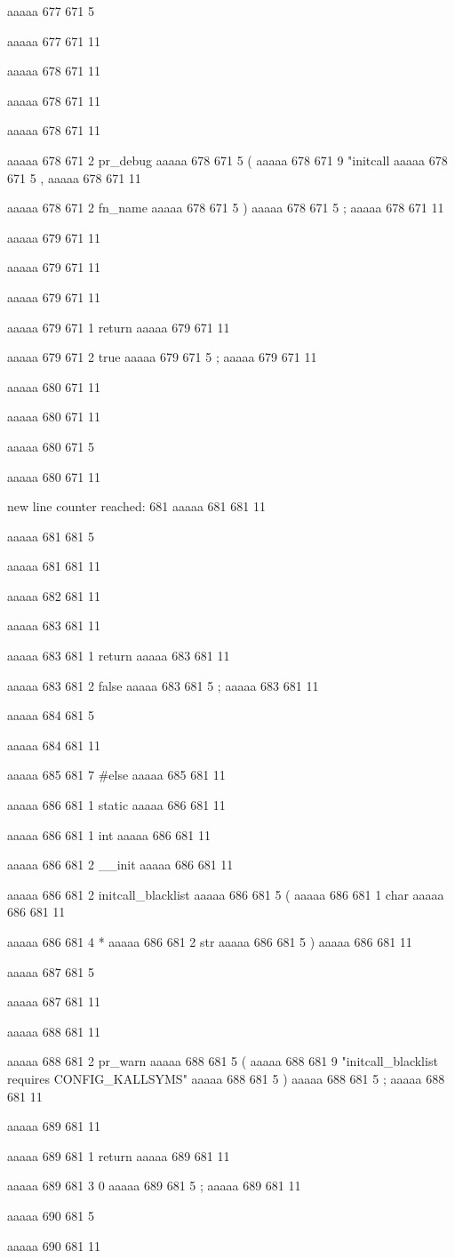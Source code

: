 {{aaaaa 677 671
5
{
aaaaa 677 671
11


aaaaa 678 671
11
	
aaaaa 678 671
11
	
aaaaa 678 671
11
	
aaaaa 678 671
2
pr_debug
aaaaa 678 671
5
(
aaaaa 678 671
9
"initcall %
aaaaa 678 671
5
,
aaaaa 678 671
11
 
aaaaa 678 671
2
fn_name
aaaaa 678 671
5
)
aaaaa 678 671
5
;
aaaaa 678 671
11


aaaaa 679 671
11
	
aaaaa 679 671
11
	
aaaaa 679 671
11
	
aaaaa 679 671
1
return
aaaaa 679 671
11
 
aaaaa 679 671
2
true
aaaaa 679 671
5
;
aaaaa 679 671
11


aaaaa 680 671
11
	
aaaaa 680 671
11
	
aaaaa 680 671
5
}
aaaaa 680 671
11


new line counter reached: 681
aaaaa 681 681
11
	
aaaaa 681 681
5
}
aaaaa 681 681
11


aaaaa 682 681
11


aaaaa 683 681
11
	
aaaaa 683 681
1
return
aaaaa 683 681
11
 
aaaaa 683 681
2
false
aaaaa 683 681
5
;
aaaaa 683 681
11


aaaaa 684 681
5
}
aaaaa 684 681
11


aaaaa 685 681
7
#else
aaaaa 685 681
11


aaaaa 686 681
1
static
aaaaa 686 681
11
 
aaaaa 686 681
1
int
aaaaa 686 681
11
 
aaaaa 686 681
2
__init
aaaaa 686 681
11
 
aaaaa 686 681
2
initcall_blacklist
aaaaa 686 681
5
(
aaaaa 686 681
1
char
aaaaa 686 681
11
 
aaaaa 686 681
4
*
aaaaa 686 681
2
str
aaaaa 686 681
5
)
aaaaa 686 681
11


aaaaa 687 681
5
{
aaaaa 687 681
11


aaaaa 688 681
11
	
aaaaa 688 681
2
pr_warn
aaaaa 688 681
5
(
aaaaa 688 681
9
"initcall_blacklist requires CONFIG_KALLSYMS\n"
aaaaa 688 681
5
)
aaaaa 688 681
5
;
aaaaa 688 681
11


aaaaa 689 681
11
	
aaaaa 689 681
1
return
aaaaa 689 681
11
 
aaaaa 689 681
3
0
aaaaa 689 681
5
;
aaaaa 689 681
11


aaaaa 690 681
5
}
aaaaa 690 681
11


